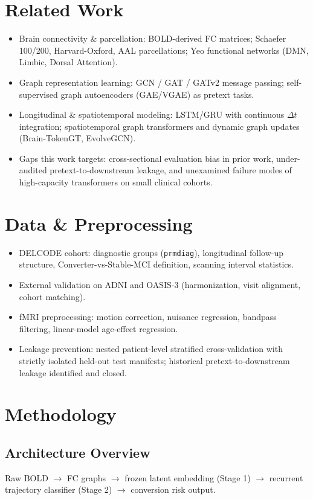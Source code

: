 \documentclass[11pt,a4paper]{article}
\begin{document}
\section{Related Work}
\begin{itemize}
  \item Brain connectivity \& parcellation: BOLD-derived FC matrices;
    Schaefer 100/200, Harvard-Oxford, AAL parcellations; Yeo functional
    networks (DMN, Limbic, Dorsal Attention).
  \item Graph representation learning: GCN / GAT / GATv2 message passing;
    self-supervised graph autoencoders (GAE/VGAE) as pretext tasks.
  \item Longitudinal \& spatiotemporal modeling: LSTM/GRU with continuous
    $\Delta t$ integration; spatiotemporal graph transformers and dynamic
    graph updates (Brain-TokenGT, EvolveGCN).
  \item Gaps this work targets: cross-sectional evaluation bias in prior
    work, under-audited pretext-to-downstream leakage, and unexamined
    failure modes of high-capacity transformers on small clinical cohorts.
\end{itemize}

\section{Data \& Preprocessing}
\begin{itemize}
  \item DELCODE cohort: diagnostic groups (\texttt{prmdiag}), longitudinal
    follow-up structure, Converter-vs-Stable-MCI definition, scanning
    interval statistics.
  \item External validation on ADNI and OASIS-3 (harmonization, visit
    alignment, cohort matching).
  \item fMRI preprocessing: motion correction, nuisance regression, bandpass
    filtering, linear-model age-effect regression.
  \item Leakage prevention: nested patient-level stratified cross-validation
    with strictly isolated held-out test manifests; historical
    pretext-to-downstream leakage identified and closed.
\end{itemize}

\section{Methodology}

\subsection{Architecture Overview}
Raw BOLD $\to$ FC graphs $\to$ frozen latent embedding (Stage 1) $\to$
recurrent trajectory classifier (Stage 2) $\to$ conversion risk output.
\end{document}
